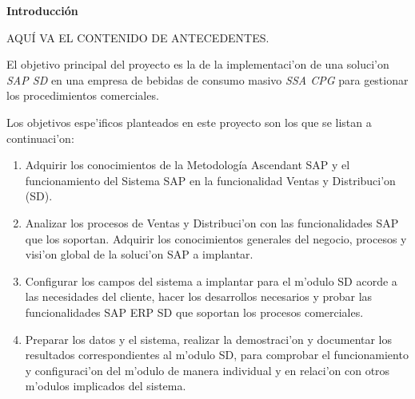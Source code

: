 
\begin{center}
	{\bf Introducci\'on} \label{chap:intro}
\end{center}


\label{sect:motivacion}


AQU\'I VA EL CONTENIDO DE ANTECEDENTES. 



\label{sect:justificacion}

\label{sect:planteamiento}
\vspace{5 mm}

\vspace{5 mm}

\label{sect:objetivo_general}
\vspace{5 mm}

\indent El objetivo principal del proyecto es la de la implementaci'on de una soluci'on \emph{SAP SD} en una empresa de bebidas de consumo masivo \emph{SSA CPG} para gestionar los procedimientos comerciales. 


\vspace{5 mm}

\label{sect:objetivos_especificos}
\vspace{5 mm}

 Los objetivos espe'ificos planteados en este proyecto son los que se listan a continuaci'on:
\begin{enumerate}
\item Adquirir los conocimientos de la Metodología Ascendant SAP y el funcionamiento del Sistema SAP en la funcionalidad Ventas y Distribuci'on (SD).

\item Analizar los procesos de Ventas y Distribuci'on con las funcionalidades SAP que los soportan. Adquirir los conocimientos generales del negocio, procesos y visi'on global de la soluci'on SAP a implantar.

\item Configurar los campos del sistema a implantar para el m'odulo SD acorde a las necesidades del cliente, hacer los desarrollos necesarios y probar las funcionalidades SAP ERP SD que soportan los procesos comerciales.

\item Preparar los datos y el sistema, realizar la demostraci'on y documentar los resultados correspondientes al m'odulo SD, para comprobar el funcionamiento y configuraci'on del m'odulo de manera individual y en relaci'on con otros m'odulos implicados del sistema.

\end{enumerate}





